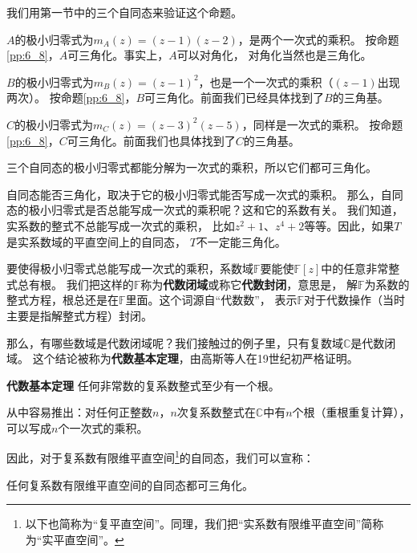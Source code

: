 \documentclass[12pt,UTF8]{ctexbook}
\begin{document}
我们用第一节中的三个自同态来验证这个命题。

$A$的极小归零式为$m_A(z) = (z-1)(z-2)$，是两个一次式的乘积。
按命题\ref{pp:6_8}，$A$可三角化。事实上，$A$可以对角化，
对角化当然也是三角化。

$B$的极小归零式为$m_B(z) = (z-1)^2$，也是一个一次式的乘积（$(z-1)$出现两次）。
按命题\ref{pp:6_8}，$B$可三角化。前面我们已经具体找到了$B$的三角基。

$C$的极小归零式为$m_C(z) = (z-3)^2(z-5)$，同样是一次式的乘积。
按命题\ref{pp:6_8}，$C$可三角化。前面我们也具体找到了$C$的三角基。

三个自同态的极小归零式都能分解为一次式的乘积，所以它们都可三角化。

自同态能否三角化，取决于它的极小归零式能否写成一次式的乘积。
那么，自同态的极小归零式是否总能写成一次式的乘积呢？这和它的系数有关。
我们知道，实系数的整式不总能写成一次式的乘积，
比如$z^2+1$、$z^4+2$等等。因此，如果$T$是实系数域的平直空间上的自同态，
$T$不一定能三角化。

要使得极小归零式总能写成一次式的乘积，系数域$\mathbb{F}$要能使$\mathbb{F}[z]$中的任意非常整式总有根。
我们把这样的$\mathbb{F}$称为\textbf{代数闭域}或称它\textbf{代数封闭}，意思是，
解$\mathbb{F}$为系数的整式方程，根总还是在$\mathbb{F}$里面。这个词源自“代数数”，
表示$\mathbb{F}$对于代数操作（当时主要是指解整式方程）封闭。

那么，有哪些数域是代数闭域呢？我们接触过的例子里，只有复数域$\mathbb{C}$是代数闭域。
这个结论被称为\textbf{代数基本定理}，由高斯等人在19世纪初严格证明。

\begin{pp}\textbf{代数基本定理}\label{pp:6_9}
    任何非常数的复系数整式至少有一个根。
\end{pp}
从中容易推出：对任何正整数$n$，$n$次复系数整式在$\mathbb{C}$中有$n$个根（重根重复计算），可以写成$n$个一次式的乘积。

因此，对于复系数有限维平直空间\footnote{以下也简称为“复平直空间”。同理，我们把“实系数有限维平直空间”简称为“实平直空间”。}的自同态，我们可以宣称：
\begin{pp}\label{pp:6_10}
    任何复系数有限维平直空间的自同态都可三角化。
\end{pp}
\end{document}
